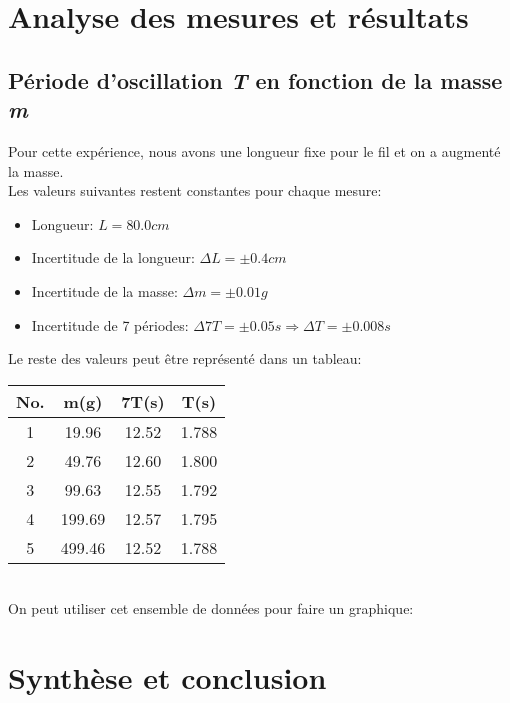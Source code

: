 \documentclass[12pt,a4paper]{article}
\begin{document}
    \section{Analyse des mesures et résultats}
    \subsection{Période d'oscillation \textit{T} en fonction de la masse \textit{m}}
    Pour cette expérience, nous avons une longueur fixe pour le fil et on a augmenté la masse. \\
    Les valeurs suivantes restent constantes pour chaque mesure:
    \begin{itemize}
        \item Longueur: $L=80.0cm$
        \item Incertitude de la longueur: $\Delta L=\pm 0.4cm$
        \item Incertitude de la masse: $\Delta m=\pm 0.01g$
        \item Incertitude de 7 périodes: $\Delta 7T=\pm 0.05s \Rightarrow \Delta T=\pm 0.008s$
    \end{itemize}
    Le reste des valeurs peut être représenté dans un tableau:
    \begin{table}[htbp]
        \centering
        \begin{minipage}{0.4\textwidth}
            \begin{tabular}{c|c|c|c}
                \textbf{No.} & \textbf{m(g)} & \textbf{7T(s)} & \textbf{T(s)} \\
                \toprule
                1 & 19.96 & 12.52 & 1.788 \\
                2 & 49.76 & 12.60 & 1.800 \\
                3 & 99.63 & 12.55 & 1.792 \\
                4 & 199.69 & 12.57 & 1.795 \\
                5 & 499.46 & 12.52 & 1.788 \\
            \end{tabular}
        \end{minipage}%
        \begin{minipage}{0.6\textwidth}
            \centering
        \end{minipage}
    \end{table} \\
    On peut utiliser cet ensemble de données pour faire un graphique:
    \section{Synthèse et conclusion}
\end{document}
